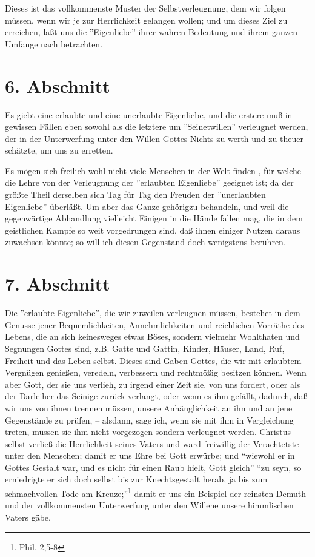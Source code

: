 Dieses ist das vollkommenste Muster der Selbstverleugnung, dem wir folgen
müssen, wenn wir je zur Herrlichkeit gelangen wollen; und um dieses Ziel zu
erreichen, laßt uns die ''Eigenliebe'' ihrer wahren Bedeutung und ihrem ganzen
Umfange nach betrachten.

\section{6. Abschnitt} \label{kap4_ab6}

Es giebt eine erlaubte und eine unerlaubte Eigenliebe, und die erstere muß in
gewissen Fällen eben sowohl als die letztere um ''Seinetwillen'' verleugnet
werden, der in der Unterwerfung unter den Willen Gottes Nichts zu werth und zu
theuer schätzte, um uns zu erretten.

Es mögen sich freilich wohl nicht viele Menschen in der Welt finden , für welche
die Lehre von der Verleugnung der ''erlaubten Eigenliebe'' geeignet ist; da der
größte Theil derselben sich Tag für Tag den Freuden der ''unerlaubten
Eigenliebe'' überläßt. Um aber das Ganze gehörigzu behandeln, und weil die
gegenwärtige Abhandlung vielleicht Einigen in die Hände fallen mag, die in dem
geistlichen Kampfe so weit vorgedrungen sind, daß ihnen einiger Nutzen daraus
zuwachsen könnte; so will ich diesen Gegenstand doch wenigstens berühren.

\section{7. Abschnitt} \label{kap4_ab7}

Die ''erlaubte Eigenliebe'', die wir zuweilen verleugnen müssen, bestehet in dem
Genusse jener Bequemlichkeiten, Annehmlichkeiten und reichlichen Vorräthe des
Lebens, die an sich keinesweges etwas Böses, sondern vielmehr Wohlthaten und
Segnungen Gottes sind, z.B. Gatte und Gattin, Kinder, Häuser, Land, Ruf,
Freiheit und das Leben selbst. Dieses sind Gaben Gottes, die wir mit erlaubtem
Vergnügen genießen, veredeln, verbessern und rechtmößig besitzen können. Wenn
aber Gott, der sie uns verlieh, zu irgend einer Zeit sie. von uns fordert, oder
als der Darleiher das Seinige zurück verlangt, oder wenn es ihm gefällt,
dadurch, daß wir uns von ihnen trennen müssen, unsere Anhänglichkeit an ihn und
an jene Gegenstände zu prüfen, -- alsdann, sage ich, wenn sie mit ihm in
Vergleichung treten, müssen sie ihm nicht vorgezogen sondern verleugnet werden.
Christus selbst verließ die Herrlichkeit seines Vaters und ward freiwillig der
Verachtetste unter den Menschen; damit er uns Ehre bei Gott erwürbe; und
"`wiewohl er in Gottes Gestalt war, und es nicht für einen Raub hielt, Gott
gleich"' "`zu seyn, so erniedrigte er sich doch selbst bis zur Knechtsgestalt
herab, ja bis zum schmachvollen Tode am Kreuze;"'\footnote{Phil. 2,5-8} damit er
uns ein Beispiel der reinsten Demuth und der vollkommensten Unterwerfung unter
den Willene unsere himmlischen Vaters gäbe.

